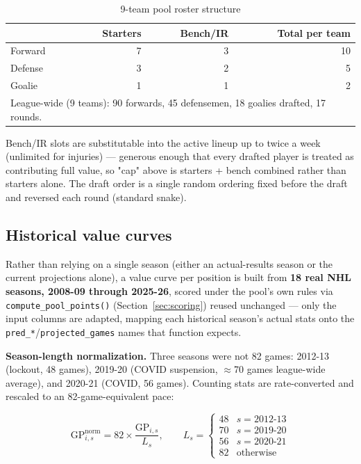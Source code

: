 \documentclass[11pt, a4paper]{article}
\begin{document}
\begin{table}[h]
\centering
\caption{9-team pool roster structure}
\label{tab:draftroster}
\begin{tabular}{lrrr}
\toprule
 & Starters & Bench/IR & Total per team \\
\midrule
Forward & 7 & 3 & 10 \\
Defense & 3 & 2 & 5 \\
Goalie  & 1 & 1 & 2 \\
\midrule
\multicolumn{4}{l}{League-wide (9 teams): 90 forwards, 45 defensemen, 18 goalies drafted, 17 rounds.} \\
\bottomrule
\end{tabular}
\end{table}

Bench/IR slots are substitutable into the active lineup up to twice a week (unlimited for
injuries) — generous enough that every drafted player is treated as contributing full value, so
"cap" above is starters + bench combined rather than starters alone. The draft order is a single
random ordering fixed before the draft and reversed each round (standard snake).

\subsection{Historical value curves}

Rather than relying on a single season (either an actual-results season or the current
projections alone), a value curve per position is built from \textbf{18 real NHL seasons,
2008-09 through 2025-26}, scored under the pool's own rules via
\texttt{compute\_pool\_points()} (Section~\ref{sec:scoring}) reused unchanged — only the input
columns are adapted, mapping each historical season's actual stats onto the
\texttt{pred\_*}/\texttt{projected\_games} names that function expects.

\textbf{Season-length normalization.} Three seasons were not 82 games: 2012-13 (lockout, 48
games), 2019-20 (COVID suspension, $\approx$70 games league-wide average), and 2020-21 (COVID,
56 games). Counting stats are rate-converted and rescaled to an 82-game-equivalent pace:

\begin{equation}
  \text{GP}^{\text{norm}}_{i,s} = 82 \times \frac{\text{GP}_{i,s}}{L_s}, \qquad
  L_s = \begin{cases} 48 & s = \text{2012-13} \\ 70 & s = \text{2019-20} \\
                       56 & s = \text{2020-21} \\ 82 & \text{otherwise} \end{cases}
\end{equation}
\end{document}
